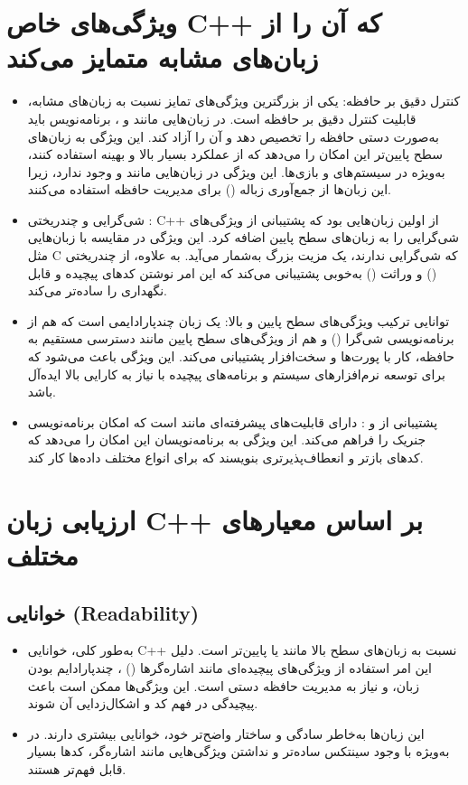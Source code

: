 \documentclass[12pt, a4paper]{report}
\begin{document}
\section{ویژگی‌های خاص C++ که آن را از زبان‌های مشابه متمایز می‌کند}
\begin{itemize}
\item 
کنترل دقیق بر حافظه: یکی از بزرگترین ویژگی‌های تمایز  نسبت به زبان‌های مشابه، قابلیت کنترل دقیق بر حافظه است. در زبان‌هایی مانند   و ، برنامه‌نویس باید به‌صورت دستی حافظه را تخصیص دهد و آن را آزاد کند. این ویژگی به زبان‌های سطح پایین‌تر این امکان را می‌دهد که از عملکرد بسیار بالا و بهینه استفاده کنند، به‌ویژه در سیستم‌های  و بازی‌ها. این ویژگی در زبان‌هایی مانند   و   وجود ندارد، زیرا این زبان‌ها از جمع‌آوری زباله () برای مدیریت حافظه استفاده می‌کنند.
\item 
شی‌گرایی و چندریختی : C++ از اولین زبان‌هایی بود که پشتیبانی از ویژگی‌های شی‌گرایی را به زبان‌های سطح پایین اضافه کرد. این ویژگی در مقایسه با زبان‌هایی مثل C  که شی‌گرایی ندارند، یک مزیت بزرگ به‌شمار می‌آید. به علاوه،   از چندریختی () و وراثت () به‌خوبی پشتیبانی می‌کند که این امر نوشتن کدهای پیچیده و قابل نگهداری را ساده‌تر می‌کند.
\item 
توانایی ترکیب ویژگی‌های سطح پایین و بالا: یک زبان چندپارادایمی است که هم از برنامه‌نویسی شی‌گرا () و هم از ویژگی‌های سطح پایین مانند دسترسی مستقیم به حافظه، کار با پورت‌ها و سخت‌افزار پشتیبانی می‌کند. این ویژگی باعث می‌شود که برای توسعه نرم‌افزارهای سیستم و برنامه‌های پیچیده با نیاز به کارایی بالا ایده‌آل باشد.
\item 
پشتیبانی از  و :  دارای قابلیت‌های پیشرفته‌ای مانند  است که امکان برنامه‌نویسی جنریک را فراهم می‌کند. این ویژگی به برنامه‌نویسان این امکان را می‌دهد که کدهای بازتر و انعطاف‌پذیرتری بنویسند که برای انواع مختلف داده‌ها کار کند.
\end{itemize}

\section{ارزیابی زبان C++ بر اساس معیارهای مختلف}
\subsection{خوانایی (Readability)}
\begin{itemize}
	\item 
    به‌طور کلی، خوانایی C++ نسبت به زبان‌های سطح بالا مانند   یا   پایین‌تر است. دلیل این امر استفاده از ویژگی‌های پیچیده‌ای مانند اشاره‌گرها () ، چندپارادایم بودن زبان، و نیاز به مدیریت حافظه دستی است. این ویژگی‌ها ممکن است باعث پیچیدگی در فهم کد و اشکال‌زدایی آن شوند.
\item 
{} این زبان‌ها به‌خاطر سادگی و ساختار واضح‌تر خود، خوانایی بیشتری دارند. در  به‌ویژه با وجود سینتکس ساده‌تر و نداشتن ویژگی‌هایی مانند اشاره‌گر، کدها بسیار قابل فهم‌تر هستند.
\end{itemize}
\end{document}
